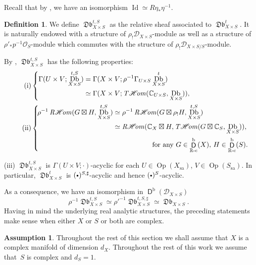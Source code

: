 \documentclass[english]{smfart}
\numberwithin{subsection}{section}
\def\shd{\mathcal{D}}\let\cD\shd
\def\sho{\mathcal{O}}\let\cO\sho
\newcommand{\R}{\mathbb{R}}\let\RR\R
\newcommand{\shhom}{\mathcal{H}\!\mathit{om}}\let\ho\shhom
\DeclareMathOperator{\rh}{\mathit{R}\shhom}
\DeclareMathOperator{\tho}{\mathit{T}\shhom}
\newcommand{\rb}{\mathrm{b}}
\newcommand{\imin}[1]{#1^{-1}}
\newcommand{\sa}{\mathrm{sa}}
\newcommand{\rc}{{\R\textup{-c}}}
\newcommand{\XS}{X\times S}
\newcommand{\DXS}{\shd_{\XS/S}}
\DeclareMathOperator{\rD}{\mathsf{D}}
\DeclareMathOperator{\Db}{\mathfrak{Db}}
\DeclareMathOperator{\id}{Id}\let\Id\id
\DeclareMathOperator{\Op}{Op}
\newcommand{\cbbullet}{{\raisebox{1pt}{$\sbullet$}}}
\newcommand{\sbullet}{{\scriptscriptstyle\bullet}}
\numberwithin{equation}{section}
\theoremstyle{plain}
\theoremstyle{definition}
\newtheorem{assumption}[equation]{Assumption}
\newtheorem{definition}[equation]{Definition}
\begin{document}
Recall that by \cite[Lem.\,3.4]{MF-P14}, we have an isomorphism $\id \simeq R\eta_*\eta^{-1}$.

\begin{definition}\label{Dbt}
We define $\Db_{\XS}^{t,S}$ as the relative sheaf associated to $\Db^{t}_{\XS}$. It is naturally endowed with a structure of $\rho_!\shd_{\XS}$-module as well as a structure of $\rho'_*p^{-1}\sho_S$-module which commutes with the structure of $\rho_!\DXS$-module.
\end{definition}

By \cite[ Props.\,5.1(2), 5.2(i) and 5.3(2)]{MF-P14}, $\Db^{t,S}_{\XS}$ has the following properties:
\begin{align*}
\tag{i}
&\left\{\begin{aligned}
\Gamma(U \times V;\Db^{t,S}_{\XS})&=\Gamma(X \times V;\imin\rho\Gamma_{U \times S}\Db_{\XS}^t)\\
&\simeq \Gamma(X \times V;\tho(\CC_{U \times S},\Db_{\XS})),
\end{aligned}\right.\\
\tag{ii}
&\left\{\begin{aligned}
\!\imin\rho\rh(G \boxtimes H,\Db^{t,S}_{\XS}) &\simeq \imin\rho\rh(G \boxtimes \rho_!H,\Db_{\XS}^{t,S})\\
&\simeq \rh(\CC_X \boxtimes H,\tho(G \boxtimes \CC_S,\Db_{\XS})),\\
&\hspace*{2cm}\text{for any $G\in \rD^\rb_\rc(X), \, H\in \rD^\rb_\rc(S)$.}
\end{aligned}\right.
\end{align*}

\noindent(iii)
$\Db^{t,S}_{\XS}$ is $\Gamma(U \times V;\cdot)$-acyclic for each $U \in \Op(X_\sa)$, $V \in \Op(S_\sa)$. In particular, $\Db^{t}_{\XS}$ is $(\cbbullet)^{S,\sharp}$-acyclic and hence $(\cbbullet)^S$-acyclic.

As a consequence, we have an isomorphism in $\rD^\rb(\shd_{\XS})$
\begin{equation}\label{E:23}
\rho^{-1}\Db^{t,S}_{\XS}\simeq {\rho'}^ {-1}\Db^{t, S,\sharp}_{\XS}\simeq \Db_{\XS}.
\end{equation}
Having in mind the underlying real analytic structures, the preceding statements make sense when either $X$ or $S$ or both are complex.
\begin{assumption} {Throughout the rest of this section we shall assume that $X$ is a complex manifold of dimension $d_X$. Throughout the rest of this work we assume that~$S$ is complex and $d_S=1$.}
\end{assumption}
\end{document}
